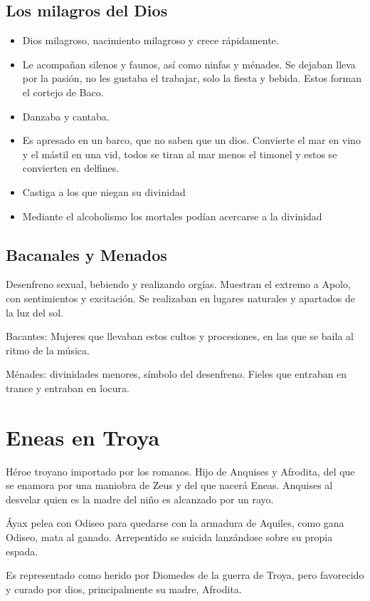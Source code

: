 \subsection{Los milagros del Dios}
\begin{itemize}
	\item Dios milagroso, nacimiento milagroso y crece rápidamente.
	\item Le acompañan silenos y faunos, así como ninfas y ménades. Se dejaban lleva por la pasión, no les gustaba el trabajar, solo la fiesta y bebida. Estos forman el cortejo de Baco.
	\item Danzaba y cantaba.
	\item Es apresado en un barco, que no saben que un dios. Convierte el mar en vino y el mástil en una vid, todos se tiran al mar menos el timonel y estos se convierten en delfines.
	\item Castiga a los que niegan su divinidad
	\item Mediante el alcoholismo los mortales podían acercarse a la divinidad
\end{itemize}

\subsection{Bacanales y Menados}
Desenfreno sexual, bebiendo y realizando orgías. Muestran el extremo a Apolo, con sentimientos y excitación. Se realizaban en lugares naturales y apartados de la luz del sol.

Bacantes: Mujeres que llevaban estos cultos y procesiones, en las que se baila al ritmo de la música.

Ménades: divinidades menores, símbolo del desenfreno. Fieles que entraban en trance y entraban en locura.

\section{Eneas en Troya}
Héroe troyano importado por los romanos. Hijo de Anquises y Afrodita, del que se enamora por una maniobra de Zeus y del que nacerá Eneas. Anquises al desvelar quien es la madre del niño es alcanzado por un rayo.

Áyax pelea con Odiseo para quedarse con la armadura de Aquiles, como gana Odiseo, mata al ganado. Arrepentido se suicida lanzándose sobre su propia espada.

Es representado como herido por Diomedes de la guerra de Troya, pero favorecido y curado por dios, principalmente su madre, Afrodita.

